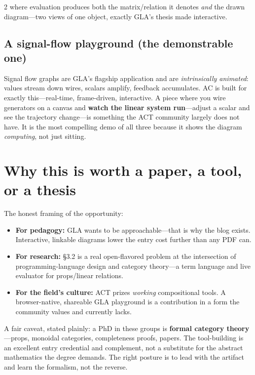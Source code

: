 \documentclass[11pt, letterpaper]{article}
\begin{document}
\begin{multicols}{2}
\noindent where evaluation produces both the matrix/relation it denotes
\emph{and} the drawn diagram---two views of one object, exactly GLA's
thesis made interactive.

\subsection{A signal-flow playground (the demonstrable one)}

Signal flow graphs are GLA's flagship application and are
\emph{intrinsically animated}: values stream down wires, scalars amplify,
feedback accumulates. AC is built for exactly this---real-time,
frame-driven, interactive. A piece where you wire generators on a canvas
and \textbf{watch the linear system run}---adjust a scalar and see the
trajectory change---is something the ACT community largely does not have.
It is the most compelling demo of all three because it shows the diagram
\emph{computing}, not just sitting.

\section{Why this is worth a paper, a tool, or a thesis}

The honest framing of the opportunity:

\begin{itemize}
  \item \textbf{For pedagogy:} GLA wants to be approachable---that is why
    the blog exists. Interactive, linkable diagrams lower the entry cost
    further than any PDF can.
  \item \textbf{For research:} \S3.2 is a real open-flavored problem at
    the intersection of programming-language design and category
    theory---a term language and live evaluator for props/linear
    relations.
  \item \textbf{For the field's culture:} ACT prizes \emph{working}
    compositional tools. A browser-native, shareable GLA playground is a
    contribution in a form the community values and currently lacks.
\end{itemize}

A fair caveat, stated plainly: a PhD in these groups is \textbf{formal
category theory}---props, monoidal categories, completeness proofs,
papers. The tool-building is an excellent entry credential and complement,
not a substitute for the abstract mathematics the degree demands. The
right posture is to lead with the artifact and learn the formalism, not
the reverse.


\end{multicols}
\end{document}
